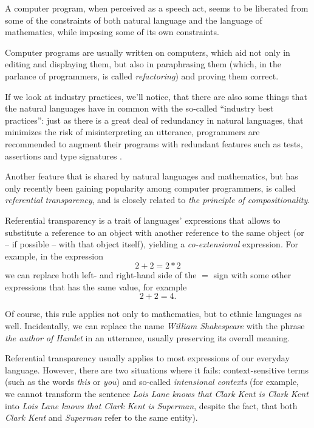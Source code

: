 A computer program, when perceived as a speech act, seems to
be liberated from some of the constraints of both natural language
and the language of mathematics, while imposing some of its own
constraints.

Computer programs are usually written on computers, which aid
not only in editing and displaying them, but also in paraphrasing
them (which, in the parlance of programmers, is called
\emph{refactoring}\cite{Fowler2000}) and proving them correct.

If we look at industry practices, we'll notice, that there are also
some things that the natural languages have in common with
the so-called ``industry best practices'': just as there is a great
deal of redundancy in natural languages, that minimizes the risk
of misinterpreting an utterance, programmers are recommended
to augment their programs with redundant features such as tests,
assertions and type
signatures\cite{Feathers} \cite{Fowler2000} \cite{HuntThomas2000}
\cite{Martin2009}.

Another feature that is shared by natural languages and mathematics,
but has only recently been gaining popularity among computer programmers,
is called \emph{referential transparency}, and is closely related to
\emph{the principle of compositionality}.

Referential transparency is a trait of languages' expressions that allows
to substitute a reference to an object with another reference to the same
object (or -- if possible -- with that object itself), yielding
a \emph{co-extensional} expression. For example, in the expression
\begin{equation*}
  2 + 2 = 2 * 2
\end{equation*}
we can replace both left- and right-hand side of the $=$ sign with
some other expressions that has the same value, for example
\begin{equation}
  2 + 2 = 4.
\end{equation}

Of course, this rule applies not only to mathematics, but
to ethnic languages as well. Incidentally, we can replace
the name \emph{William Shakespeare} with the phrase
\emph{the author of Hamlet} in an utterance, usually preserving
its overall meaning.

Referential transparency usually applies to most expressions
of our everyday language. However, there are two situations
where it fails: context-sensitive terms (such as the words \emph{this}
or \emph{you}) and so-called \emph{intensional contexts}\cite{Frege1892}
(for example, we cannot transform the sentence \emph{Lois Lane
knows that Clark Kent is Clark Kent} into \emph{Lois Lane knows
that Clark Kent is Superman}, despite the fact, that both
\emph{Clark Kent} and \emph{Superman} refer to the same entity).

